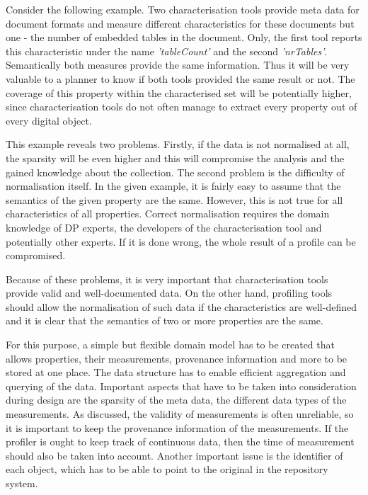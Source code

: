 Consider the following example. Two characterisation tools provide meta data for document formats and measure different characteristics for these documents but one - the number of embedded tables in the document. Only, the first tool reports this characteristic under the name \textit{'tableCount'} and the second \textit{'nrTables'}. Semantically both measures provide the same information. Thus it will be very valuable to a planner to know if both tools provided the same result or not. The coverage of this property within the characterised set will be potentially higher, since characterisation tools do not often manage to extract every property out of every digital object.

This example reveals two problems. Firstly, if the data is not normalised at all, the sparsity will be even higher and this will compromise the analysis and the gained knowledge about the collection. The second problem is the difficulty of normalisation itself. In the given example, it is fairly easy to assume that the semantics of the given property are the same. However, this is not true for all characteristics of all properties. Correct normalisation requires the domain knowledge of DP experts, the developers of the characterisation tool and potentially other experts. If it is done wrong, the whole result of a profile can be compromised.

Because of these problems, it is very important that characterisation tools provide valid and well-documented data. On the other hand, profiling tools should allow the normalisation of such data if the characteristics are well-defined and it is clear that the semantics of two or more properties are the same.

For this purpose, a simple but flexible domain model has to be created that allows properties, their measurements, provenance information and more to be stored at one place. The data structure has to enable efficient aggregation and querying of the data. Important aspects that have to be taken into consideration during design are the sparsity of the meta data, the different data types of the measurements. As discussed, the validity of measurements is often unreliable, so it is important to keep the provenance information of the measurements. If the profiler is ought to keep track of continuous data, then the time of measurement should also be taken into account. Another important issue is the identifier of each object, which has to be able to point to the original in the repository system.

